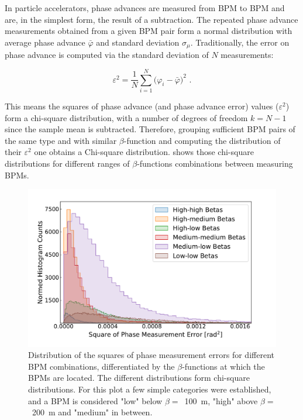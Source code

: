 In particle accelerators, phase advances are measured from BPM to BPM and are, in the simplest form, the result of a subtraction.
The repeated phase advance measurements obtained from a given BPM pair form a normal distribution with average phase advance \(\bar{\varphi}\) and standard deviation \(\sigma_{\mu}\).
Traditionally, the error on phase advance is computed via the standard deviation of \(N\) measurements:

\begin{equation}
    \varepsilon^2 = \frac{1}{N} \sum_{i=1}^{N}\big(\varphi_{i} - \bar{\varphi} \big)^2 \text{ .}
    \label{equation:phase_error_calculation}
\end{equation}

This means the squares of phase advance (and phase advance error) values (\(\varepsilon^2\)) form a chi-square distribution, with a number of degrees of freedom  \(k = N - 1\) since the sample mean is subtracted.
Therefore, grouping sufficient BPM pairs of the same type and with similar \(\beta\)-function and computing the distribution of their \(\varepsilon^2\) one obtains a Chi-square distribution.
 shows those chi-square distributions for different ranges of \(\beta\)-functions combinations between measuring BPMs.

\begin{figure}[!htb]
    \centering
    \includegraphics*[width=\textwidth]{Figures/Other_Studies/phase_errors_squared_distributions.pdf}
    \caption{Distribution of the squares of phase measurement errors for different BPM combinations, differentiated by the \(\beta\)-functions at which the BPMs are located. The different distributions form chi-square distributions. For this plot a few simple categories were established, and a BPM is considered "low" below \(\beta =\)~\qty{100}{\meter}, "high" above \(\beta =\)~\qty{200}{\meter} and "medium" in between.}
    \label{figure:square_errors_histograms}
\end{figure}

